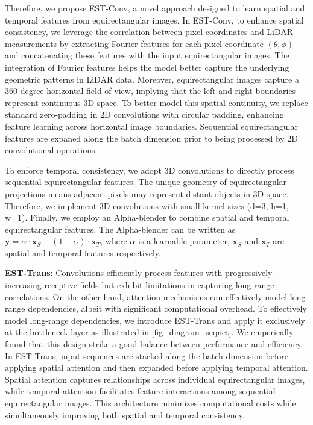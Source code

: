 Therefore, we propose EST-Conv, a novel approach designed to learn spatial and temporal features from equirectangular images.
In EST-Conv, to enhance spatial consistency, we leverage the correlation between pixel coordinates and LiDAR measurements by extracting Fourier features \cite{tancik2020fourier} for each pixel coordinate $(\theta, \phi)$ and concatenating these features with the input equirectangular images. The integration of Fourier features helps the model better capture the underlying geometric patterns in LiDAR data.
Moreover, equirectangular images capture a 360-degree horizontal field of view, implying that the left and right boundaries represent continuous 3D space. To better model this spatial continuity, we replace standard zero-padding in 2D convolutions with circular padding, enhancing feature learning across horizontal image boundaries. Sequential equirectangular features are expaned along the batch dimension prior to being processed by 2D convolutional operations.  

To enforce temporal consistency, we adopt 3D convolutions to directly process sequential equirectangular features. The unique geometry of equirectangular projections means adjacent pixels may represent distant objects in 3D space. Therefore, we implement 3D convolutions with small kernel sizes (d=3, h=1, w=1). Finally, we employ an Alpha-blender \cite{blattmann2023stable} to combine spatial and temporal equirectangular features. The Alpha-blender can be written as $\boldsymbol{y}=\alpha\cdot \boldsymbol{x}_S+(1-\alpha)\cdot\boldsymbol{x}_T$, where $\alpha$ is a learnable parameter, $\boldsymbol{x}_S$ and $\boldsymbol{x}_T$ are spatial and temporal features respectively. 


\noindent \textbf{EST-Trans}:
Convolutions efficiently process features with progressively increasing receptive fields but exhibit limitations in capturing long-range correlations. On the other hand, attention mechanisms can effectively model long-range dependencies, albeit with significant computational overhead.
To effectively model long-range dependencies, we introduce EST-Trans and apply it exclusively at the bottleneck layer as illustrated in \cref{fig_diagram_seqnet}. We emperically found that this design strike a good balance between performance and efficiency.
In EST-Trans, input sequences are stacked along the batch dimension before applying spatial attention and then expanded before applying temporal attention. Spatial attention captures relationships across individual equirectangular images, while temporal attention facilitates feature interactions among sequential equirectangular images. This architecture minimizes computational costs while simultaneously improving both spatial and temporal consistency.

